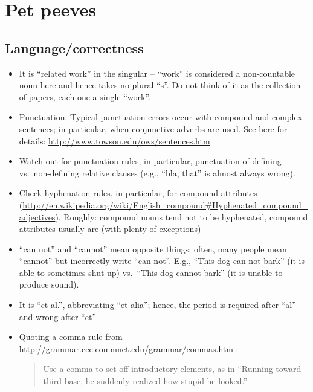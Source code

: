 
\section{Pet peeves}
\label{sec:pet-peeves}

\subsection{Language/correctness}
\label{sec:orgheadline1}
\begin{itemize}
\item It is ``related work'' in the singular -- ``work'' is considered a non-countable noun here and hence takes no plural ``s''. Do not think of it as the collection of papers, each one a single ``work''. 
\item Punctuation: Typical punctuation errors occur with compound and complex sentences; in particular, when conjunctive adverbs are used. See here for details: \url{http://www.towson.edu/ows/sentences.htm}
\item Watch out for punctuation rules, in particular, punctuation of defining vs.\ non-defining relative clauses (e.g., ``bla, that'' is almost always wrong).
\item Check hyphenation rules, in particular, for compound attributes (\url{http://en.wikipedia.org/wiki/English_compound#Hyphenated_compound_adjectives}). Roughly: compound nouns tend not to be hyphenated, compound attributes usually are (with plenty of exceptions)
\item ``can not'' and ``cannot'' mean opposite things; often, many people  mean ``cannot'' but incorrectly write ``can not''. E.g., ``This dog can not bark'' (it is able to sometimes shut up) vs.\ ``This dog cannot bark'' (it is unable to produce sound).
\item It is ``et al.'', abbreviating ``et alia''; hence, the period is required after ``al'' and wrong after ``et''
\item Quoting a comma rule from \url{http://grammar.ccc.commnet.edu/grammar/commas.htm} :

  \begin{quote}
    Use a comma to set off introductory elements, as in ``Running
    toward third base, he suddenly realized how stupid he looked.''


\end{quote}
\end{itemize}
